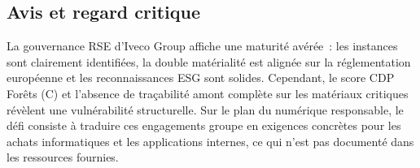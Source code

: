 \subsection*{Avis et regard critique}

La gouvernance RSE d'Iveco Group affiche une maturité avérée~: les instances sont clairement identifiées, la double matérialité est alignée sur la réglementation européenne et les reconnaissances ESG sont solides. Cependant, le score CDP Forêts (C) et l'absence de traçabilité amont complète sur les matériaux critiques révèlent une vulnérabilité structurelle. Sur le plan du numérique responsable, le défi consiste à traduire ces engagements groupe en exigences concrètes pour les achats informatiques et les applications internes, ce qui n'est pas documenté dans les ressources fournies.

